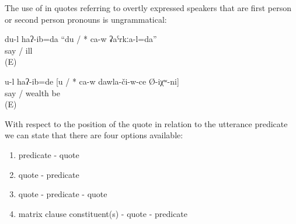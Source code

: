 The use of  in quotes referring to overtly expressed speakers that are first person or second person pronouns is ungrammatical:
%
\begin{exe}
	\ex	\label{ex:‎‎‎I said that I am sick}
	\gll	du-l	haʔ-ib=da	``du	/	{*} ca-w	ʡaˁrkːa-l=da''\\
			say			/	{} 	ill\\
	\glt	{} (E)

	\ex	\label{ex:‎You said that you were rich}
	\gll	u-l	haʔ-ib=de	[u	/	{*} ca-w	dawla-či-w-ce	Ø-iχʷ-ni]\\
			say		/	{ } 	wealth	be\\
	\glt	{} (E)
\end{exe}

With respect to the position of the quote in relation to the utterance predicate we can state that there are four options available:
%
\begin{enumerate}
	\item	predicate - quote 
	\item	quote - predicate 
	\item	quote - predicate - quote 
	\item	matrix clause constituent(s) - quote - predicate 
\end{enumerate}

